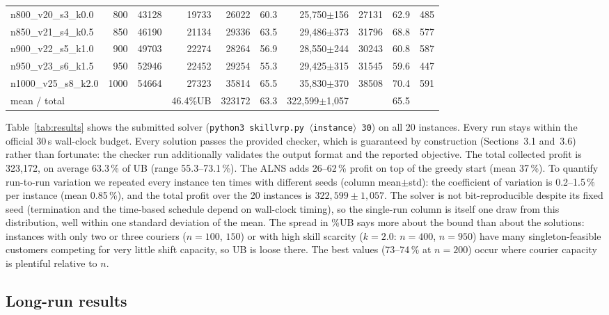 \documentclass[10pt, a4paper]{article}
\begin{document}
\begin{table}[t]
\begin{tabular}{@{}lrrrrrrrrr@{}}
n800\_v20\_s3\_k0.0  &  800 & 43128 & 19733 & 26022 & 60.3 & 25{,}750$\pm$156 & 27131 & 62.9 & 485 \\
n850\_v21\_s4\_k0.5  &  850 & 46190 & 21134 & 29336 & 63.5 & 29{,}486$\pm$373 & 31796 & 68.8 & 577 \\
n900\_v22\_s5\_k1.0  &  900 & 49703 & 22274 & 28264 & 56.9 & 28{,}550$\pm$244 & 30243 & 60.8 & 587 \\
n950\_v23\_s6\_k1.5  &  950 & 52946 & 22452 & 29254 & 55.3 & 29{,}425$\pm$315 & 31545 & 59.6 & 447 \\
n1000\_v25\_s8\_k2.0 & 1000 & 54664 & 27323 & 35814 & 65.5 & 35{,}830$\pm$370 & 38508 & 70.4 & 591 \\
\midrule
mean / total & & & 46.4\%UB & 323172 & 63.3 & 322{,}599$\pm$1{,}057 & & 65.5 & \\
\bottomrule
\end{tabular}
\end{table}

Table~\ref{tab:results} shows the submitted solver
(\texttt{python3 skillvrp.py $\langle$instance$\rangle$ 30}) on all 20
instances. Every run stays within the official 30\,s wall-clock budget.
Every solution
passes the provided checker, which is guaranteed by construction
(Sections~3.1 and~3.6) rather than fortunate: the checker run additionally
validates the output format and the reported objective. The total collected
profit is 323{,}172, on average 63.3\,\% of UB (range 55.3--73.1\,\%). The ALNS adds
26--62\,\% profit on top of the greedy start (mean 37\,\%). To quantify
run-to-run variation we repeated every instance ten times with different
seeds (column mean$\pm$std): the coefficient of variation is 0.2--1.5\,\%
per instance (mean 0.85\,\%), and the total profit over the 20 instances is
$322{,}599 \pm 1{,}057$. The solver is not bit-reproducible despite its
fixed seed (termination and the time-based schedule depend on wall-clock
timing), so the single-run column is itself one draw from this
distribution, well within one standard deviation of the mean. The spread in \%UB says
more about the bound than about the solutions: instances with only two or
three couriers ($n=100$, $150$) or with high skill scarcity ($k=2.0$: $n=400$,
$n=950$) have many singleton-feasible customers competing for very little
shift capacity, so UB is loose there. The best values (73--74\,\% at $n=200$)
occur where courier capacity is plentiful relative to $n$.

\subsection{Long-run results}
\end{document}
